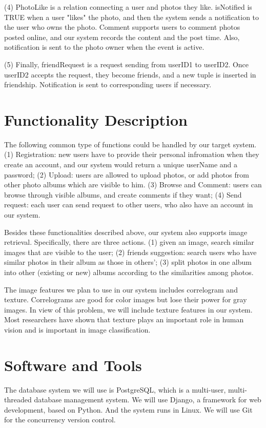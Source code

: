 \documentclass[a4paper,12pt]{article}
\begin{document}
(4) PhotoLike is a relation connecting a user and photos they like. isNotified is TRUE when a user "likes" the photo, and then the system sends a notification to the user who owns the photo. Comment supports users to comment photos posted online, and our system records the content and the post time. Also, notification is sent to the photo owner when the event is active.

(5) Finally, friendRequest is a request sending from userID1 to userID2. Once userID2 accepts the request, they become friends, and a new tuple is inserted in friendship. Notification is sent to corresponding users if necessary.

\section*{Functionality Description}
The following common type of functions could be handled by our target system.
(1) Registration: new users have to provide their personal infromation when they create an account, and our system would return a unique userName and a password; (2) Upload: users are allowed to upload photos, or add photos from other photo albums which are visible to him. (3) Browse and Comment: users can browse through visible albums, and create comments if they want; (4) Send request: each user can send request to other users, who also have an account in our system.

Besides these functionalities described above, our system also supports image retrieval. Specifically, there are three actions. (1) given an image, search similar images that are visible to the user; (2) friends suggestion: search users who have similar photos in their album as those in others'; (3) split photos in one album into other (existing or new) albums according to the similarities among photos.

The image features we plan to use in our system includes correlogram \cite{correlogram} and texture. Correlograms are good for color images but lose their power for gray images. In view of this problem, we will include texture features in our system. Most researchers have shown that texture plays an important role in human vision and is important in image classification.

\section*{Software and Tools}
The database system we will use is PostgreSQL, which is a multi-user, multi-threaded database management system. We will use Django, a framework for web development, based on Python. And the system runs in Linux. We will use Git\cite{git} for the concurrency version control.
\end{document}
